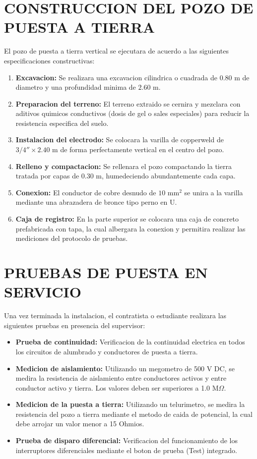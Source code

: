 \section{CONSTRUCCION DEL POZO DE PUESTA A TIERRA}

El pozo de puesta a tierra vertical se ejecutara de acuerdo a las siguientes especificaciones constructivas:
\begin{enumerate}
  \item \textbf{Excavacion:} Se realizara una excavacion cilindrica o cuadrada de \(0.80\text{ m}\) de diametro y una profundidad minima de \(2.60\text{ m}\).
  \item \textbf{Preparacion del terreno:} El terreno extraido se cernira y mezclara con aditivos quimicos conductivos (dosis de gel o sales especiales) para reducir la resistencia especifica del suelo.
  \item \textbf{Instalacion del electrodo:} Se colocara la varilla de copperweld de \(3/4'' \times 2.40\text{ m}\) de forma perfectamente vertical en el centro del pozo.
  \item \textbf{Relleno y compactacion:} Se rellenara el pozo compactando la tierra tratada por capas de \(0.30\text{ m}\), humedeciendo abundantemente cada capa.
  \item \textbf{Conexion:} El conductor de cobre desnudo de \(10\text{ mm}^2\) se unira a la varilla mediante una abrazadera de bronce tipo perno en U.
  \item \textbf{Caja de registro:} En la parte superior se colocara una caja de concreto prefabricada con tapa, la cual albergara la conexion y permitira realizar las mediciones del protocolo de pruebas.
\end{enumerate}

\section{PRUEBAS DE PUESTA EN SERVICIO}

Una vez terminada la instalacion, el contratista o estudiante realizara las siguientes pruebas en presencia del supervisor:
\begin{itemize}
  \item \textbf{Prueba de continuidad:} Verificacion de la continuidad electrica en todos los circuitos de alumbrado y conductores de puesta a tierra.
  \item \textbf{Medicion de aislamiento:} Utilizando un megometro de 500 V DC, se medira la resistencia de aislamiento entre conductores activos y entre conductor activo y tierra. Los valores deben ser superiores a 1.0 M\(\Omega\).
  \item \textbf{Medicion de la puesta a tierra:} Utilizando un telurimetro, se medira la resistencia del pozo a tierra mediante el metodo de caida de potencial, la cual debe arrojar un valor menor a 15 Ohmios.
  \item \textbf{Prueba de disparo diferencial:} Verificacion del funcionamiento de los interruptores diferenciales mediante el boton de prueba (Test) integrado.
\end{itemize}
\fi

